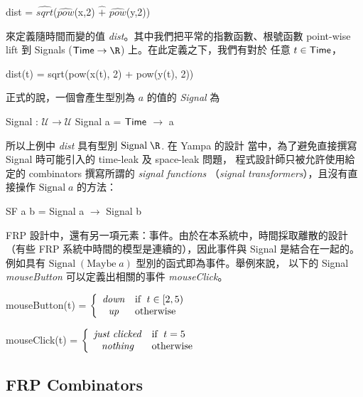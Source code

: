 \documentclass{article}
\newcommand{\U}{\mathcal{U}}
\begin{document}
  \begin{code}
  dist = $\widehat{\mathit{sqrt}}$($\widehat{\mathit{pow}}$(x,2) $\widehat{+}$ $\widehat{\mathit{pow}}$(y,2))
  \end{code}

  來定義隨時間而變的值 \textit{dist}。其中我們把平常的指數函數、根號函數
  point-wise lift 到 Signals ($\Time\to\R$) 上。在此定義之下，我們有對於
  任意 $t\in\mathsf{Time}$，

  \begin{code}
  dist(t) = sqrt(pow(x(t), 2) + pow(y(t), 2))
  \end{code}

  正式的說，一個會產生型別為 $a$ 的值的 \emph{Signal} 為

  \begin{code}
  Signal : $\U\to\U$
  Signal a = $\mathsf{Time}$ $\to$ a
  \end{code}

  所以上例中 \textit{dist} 具有型別 $\text{Signal}\; \R$. 在 Yampa 的設計
  當中，為了避免直接撰寫 Signal 時可能引入的 time-leak 及 space-leak 問題，
  程式設計師只被允許使用給定的 combinators 撰寫所謂的 \emph{signal functions}
  （\emph{signal transformers}），且沒有直接操作 $\text{Signal}\; a$ 的方法：

  \begin{code}
  SF a b = Signal a $\to$ Signal b
  \end{code}

  FRP 設計中，還有另一項元素：事件。由於在本系統中，時間採取離散的設計
  （有些 FRP 系統中時間的模型是連續的），因此事件與 Signal 是結合在一起的。
  例如具有 $\text{Signal}\;(\text{Maybe}\;a)$ 型別的函式即為事件。舉例來說，
  以下的 Signal \textit{mouseButton} 可以定義出相關的事件
  \textit{mouseClick}。

  \begin{code}
  mouseButton(t) = $\displaystyle \left\{ \begin{array}{cl} \mathit{down} & \text{if\; } t\in [2,5) \\ \mathit{up} & \text{otherwise} \end{array} \right.$

  mouseClick(t) = $\displaystyle \left\{ \begin{array}{cl} \mathit{just\; clicked} & \text{if\; } t=5 \\ \mathit{nothing} & \text{otherwise} \end{array} \right.$
  \end{code}


  \subsection{FRP Combinators}
\end{document}
